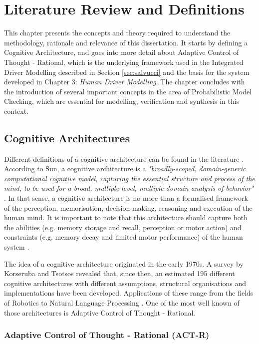 \chapter{Literature Review and Definitions}

This chapter presents the concepts and theory required to understand the methodology, rationale and relevance of this dissertation. It starts by defining a Cognitive Architecture, and goes into more detail about Adaptive Control of Thought - Rational, which is the underlying framework used in the Integrated Driver Modelling described in Section \ref{sec:salvucci} and the basis for the system developed in Chapter 3: \textit{Human Driver Modelling}. The chapter concludes with the introduction of several important concepts in the area of Probabilistic Model Checking, which are essential for modelling, verification and synthesis in this context.

\section{Cognitive Architectures}

Different definitions of a cognitive architecture can be found in the literature \cite{cog_arch_1}. According to Sun, a cognitive architecture is a \textit{"broadly-scoped, domain-generic computational cognitive model, capturing the essential structure and process of the mind, to be used for a broad, multiple-level, multiple-domain analysis of behavior"} \cite{cog_arch_2}. In that sense, a cognitive architecture is no more than a formalised framework of the perception, memorisation, decision making, reasoning and execution of the human mind. It is important to note that this architecture should capture both the abilities (e.g. memory storage and recall, perception or motor action) and constraints (e.g. memory decay and limited motor performance) of the human system \cite{salvucci_1}.

The idea of a cognitive architecture originated in the early 1970s. A survey by Korseruba and Tsotsos  \cite{cog_arch_1} revealed that, since then, an estimated 195 different cognitive architectures with different assumptions, structural organisations and implementations have been developed. Applications of these range from the fields of Robotics to Natural Language Processing \cite{cog_arch_1}. One of the most well known of those architectures is Adaptive Control of Thought - Rational.

\subsection{Adaptive Control of Thought - Rational (ACT-R)}

